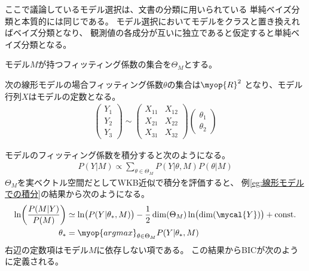 		\begin{note}[ベイズ分類]\label{note:ベイズ分類} %
			ここで議論しているモデル選択は、文書の分類に用いられている
			単純ベイズ分類と本質的には同じである。
			モデル選択においてモデルをクラスと置き換えればベイズ分類となり、
			観測値の各成分が互いに独立であると仮定すると単純ベイズ分類となる。
		\end{note} %

		モデル$M$が持つフィッティング係数の集合を$\Theta_M$とする。

		\begin{example}[フィッティング係数の集合]\label{eg:フィッティング係数の集合} %
			次の線形モデルの場合フィッティング係数$\theta$の集合は$\myop{R}^2$
			となり、モデル行列$X$はモデルの定数となる。
			\begin{equation*}\begin{split} %
				\begin{pmatrix}
					Y_1 \\ Y_2 \\ Y_3
				\end{pmatrix} \sim \begin{pmatrix}
					X_{11} & X_{12} \\ X_{21} & X_{22} \\ X_{31} & X_{32}
				\end{pmatrix}\begin{pmatrix}
					\theta_1 \\ \theta_2
				\end{pmatrix}
			\end{split}\end{equation*} %
		\end{example} %

		モデルのフィッティング係数を積分すると次のようになる。
		\begin{equation*}\begin{split} %
			P(Y|M) \propto \sum_{\theta\in\Theta_M} P(Y|\theta,M)P(\theta|M)
		\end{split}\end{equation*} %
		$\Theta_M$を実ベクトル空間だとしてWKB近似で積分を評価すると、
		例\ref{eg:線形モデルでの積分}の結果から次のようになる。
		\begin{equation*}\begin{split} %
			\ln\biggl(\frac{P(M|Y)}{P(M)}\biggr)
			&\simeq \ln\bigl(P(Y|\theta_*,M)\bigr)
			- \frac{1}{2}\dim(\Theta_M)\ln\bigl(\dim(\mycal{Y})\bigr)
			+ \text{const.} \\
			\theta_* &= \myop{argmax}_{\theta\in\Theta_M}P(Y|\theta_*,M)
		\end{split}\end{equation*} %
		右辺の定数項はモデル$M$に依存しない項である。
		この結果からBICが次のように定義される。
		
